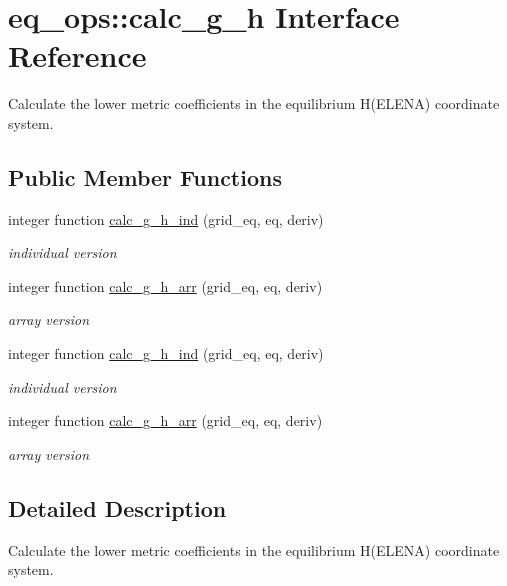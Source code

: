 \hypertarget{interfaceeq__ops_1_1calc__g__h}{}\section{eq\+\_\+ops\+:\+:calc\+\_\+g\+\_\+h Interface Reference}
\label{interfaceeq__ops_1_1calc__g__h}


Calculate the lower metric coefficients in the equilibrium H(\+E\+L\+E\+N\+A) coordinate system.  


\subsection*{Public Member Functions}
\begin{DoxyCompactItemize}
\item 
integer function \hyperlink{interfaceeq__ops_1_1calc__g__h_aa682e5ea8d778439167eea8e3eac1760}{calc\+\_\+g\+\_\+h\+\_\+ind} (grid\+\_\+eq, eq, deriv)
\begin{DoxyCompactList}\small\item\em individual version \end{DoxyCompactList}\item 
integer function \hyperlink{interfaceeq__ops_1_1calc__g__h_a4ca8a6c6aba0b1291bcfec9179f4b709}{calc\+\_\+g\+\_\+h\+\_\+arr} (grid\+\_\+eq, eq, deriv)
\begin{DoxyCompactList}\small\item\em array version \end{DoxyCompactList}\item 
integer function \hyperlink{interfaceeq__ops_1_1calc__g__h_aa682e5ea8d778439167eea8e3eac1760}{calc\+\_\+g\+\_\+h\+\_\+ind} (grid\+\_\+eq, eq, deriv)
\begin{DoxyCompactList}\small\item\em individual version \end{DoxyCompactList}\item 
integer function \hyperlink{interfaceeq__ops_1_1calc__g__h_a4ca8a6c6aba0b1291bcfec9179f4b709}{calc\+\_\+g\+\_\+h\+\_\+arr} (grid\+\_\+eq, eq, deriv)
\begin{DoxyCompactList}\small\item\em array version \end{DoxyCompactList}\end{DoxyCompactItemize}


\subsection{Detailed Description}
Calculate the lower metric coefficients in the equilibrium H(\+E\+L\+E\+N\+A) coordinate system. 

